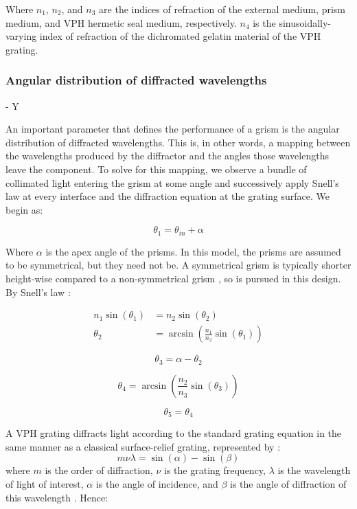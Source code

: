 Where $n_1$, $n_2$, and $n_3$ are the indices of refraction of the external medium, prism medium, and VPH hermetic seal medium, respectively. $n_4$ is the sinusoidally-varying index of refraction of the dichromated gelatin material of the VPH grating. 

\subsubsection{Angular distribution of diffracted wavelengths} - Y 

An important parameter that defines the performance of a grism is the angular distribution of diffracted wavelengths. This is, in other words, a mapping between the wavelengths produced by the diffractor and the angles those wavelengths leave the component. To solve for this mapping, we observe a bundle of collimated light entering the grism at some angle and successively apply Snell's law at every interface and the diffraction equation at the grating surface. We begin as:

\begin{equation}
\theta_1 = \theta_{in} + \alpha
\end{equation}

Where $\alpha$ is the apex angle of the prisms. In this model, the prisms are assumed to be symmetrical, but they need not be. A symmetrical grism is typically shorter height-wise compared to a non-symmetrical grism \cite{Hill2003-ko}, so is pursued in this design. By Snell's law \cite{Wikipedia_contributors_undated-ti}:

\begin{align} 
n_1 \sin\left( \theta_1 \right) &= n_2 \sin\left( \theta_2 \right) \\ 
\theta_2 &= \arcsin\left( \frac{n_1}{n_2} \sin\left( \theta_1 \right) \right) 
\end{align} 

\begin{equation}
\theta_3 = \alpha - \theta_2
\end{equation}

\begin{equation}
\theta_4 = \arcsin\left( \frac{n_2}{n_3} \sin\left( \theta_3 \right) \right) 
\end{equation}


\begin{equation}
\theta_5 = \theta_4
\end{equation}

A VPH grating diffracts light according to the standard grating equation in the same manner as a classical surface-relief grating, represented by \cite{Barden1999-vq, Barden2000-sv}:
\begin{equation} 
m\nu\lambda = \sin\left( \alpha \right) - \sin\left( \beta \right) \label{eq:grating}
\end{equation} 
where $m$ is the order of diffraction, $\nu$ is the grating frequency, $\lambda$ is the wavelength of light of interest, $\alpha$ is the angle of incidence, and $\beta$ is the angle of diffraction of this wavelength \cite{Barden1999-vq, Barden2000-sv}. Hence:

